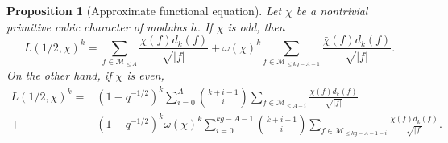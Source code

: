 \documentclass[table]{amsart}
\newtheorem{proposition}[theorem]{Proposition}
\newcommand{\cM}{\mathcal{M}}
\numberwithin{equation}{section}
\begin{document}
\begin{proposition}[Approximate functional equation]\label{approx funct eqn}
    Let $\chi$ be a nontrivial primitive cubic character of modulus $h$. If $\chi$ is odd, then
    \[L(1/2, \chi)^k=\sum_{f\in \cM_{\leq A}}\frac{\chi(f)d_k(f)}{\sqrt{|f|}}+ \omega(\chi)^k\sum_{f\in \cM_{\leq kg-A-1}}  \frac{\bar{\chi}(f) d_{k}(f)}{\sqrt{|f|}}.\]
    On the other hand, if $\chi$ is even, 
    \[\begin{split}L(1/2, \chi)^k=&(1-q^{-1/2})^k \sum_{i=0}^{A}\binom{k+i-1}{i}\sum_{f\in \cM_{\leq A-i}}\frac{\chi(f)d_k(f)}{\sqrt{|f|}} \\ + & (1-q^{-1/2})^k \omega(\chi)^k \sum_{i=0}^{kg-A-1}\binom{k+i-1}{i}\sum_{f\in \cM_{\leq kg-A-1-i}}  \frac{\bar{\chi}(f) d_{k}(f)}{\sqrt{|f|}}.
    \end{split}\]
\end{proposition}
\end{document}
